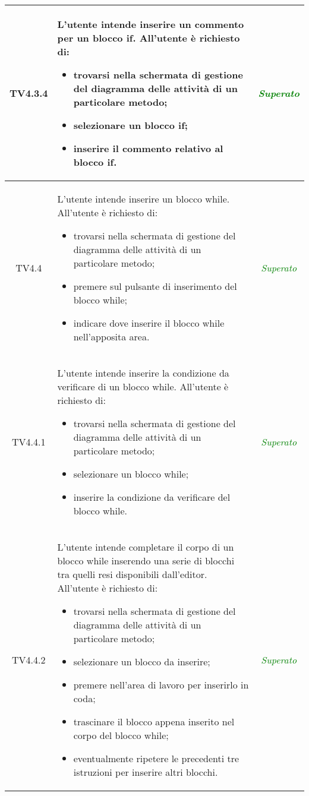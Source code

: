 \begin{longtable}{|c|>{}m{8cm}|c|}
\hypertarget{TV4.3.4}{TV4.3.4} & L'utente intende inserire un commento per un blocco if.
All'utente è richiesto di:
\begin{itemize}
	\item trovarsi nella schermata di gestione del diagramma delle attività di un particolare metodo;
	\item selezionare un blocco if;
	\item inserire il commento relativo al blocco if.
\end{itemize} & \textcolor{Green}{\textit{Superato}}\\ \hline

\hypertarget{TV4.4}{TV4.4} & L'utente intende inserire un blocco while.
All'utente è richiesto di:
\begin{itemize}
	\item trovarsi nella schermata di gestione del diagramma delle attività di un particolare metodo;
	\item premere sul pulsante di inserimento del blocco while;
	\item indicare dove inserire il blocco while nell'apposita area.
\end{itemize} & \textcolor{Green}{\textit{Superato}}\\ \hline

\hypertarget{TV4.4.1}{TV4.4.1} & L'utente intende inserire la condizione da verificare di un blocco while.
All'utente è richiesto di:
\begin{itemize}
	\item trovarsi nella schermata di gestione del diagramma delle attività di un particolare metodo;
	\item selezionare un blocco while;
	\item inserire la condizione da verificare del blocco while.
\end{itemize} & \textcolor{Green}{\textit{Superato}}\\ \hline

\hypertarget{TV4.4.2}{TV4.4.2} & L'utente intende completare il corpo di un blocco while inserendo una serie di blocchi tra quelli resi disponibili dall'editor.
All'utente è richiesto di:
\begin{itemize}
	\item trovarsi nella schermata di gestione del diagramma delle attività di un particolare metodo;
	\item selezionare un blocco da inserire;
	\item premere nell'area di lavoro per inserirlo in coda;
	\item trascinare il blocco appena inserito nel corpo del blocco while;
	\item eventualmente ripetere le precedenti tre istruzioni per inserire altri blocchi.
\end{itemize} & \textcolor{Green}{\textit{Superato}}\\ \hline


\end{longtable}
